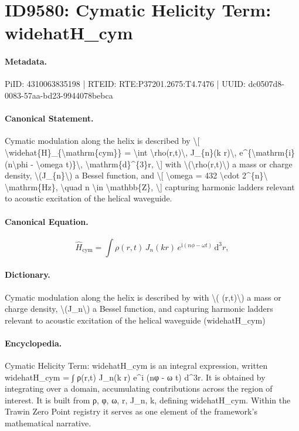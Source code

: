 \section*{ID9580: Cymatic Helicity Term: widehatH\_cym}
\paragraph{Metadata.}
PiID: 4310063835198 | RTEID: RTE:P37201.2675:T4.7476 | UUID: dc0507d8-0083-57aa-bd23-9944078bebca

\paragraph{Canonical Statement.}
Cymatic modulation along the helix is described by \textbackslash{}[ \textbackslash{}widehat\{H\}\_\{\textbackslash{}mathrm\{cym\}\} = \textbackslash{}int \textbackslash{}rho(r,t)\textbackslash{}, J\_\{n\}(k r)\textbackslash{}, e\textasciicircum{}\{\textbackslash{}mathrm\{i\} (n\textbackslash{}phi - \textbackslash{}omega t)\}\textbackslash{}, \textbackslash{}mathrm\{d\}\textasciicircum{}\{3\}r, \textbackslash{}] with \textbackslash{}(\textbackslash{}rho(r,t)\textbackslash{}) a mass or charge density, \textbackslash{}(J\_\{n\}\textbackslash{}) a Bessel function, and \textbackslash{}[ \textbackslash{}omega = 432 \textbackslash{}cdot 2\textasciicircum{}\{n\}\textbackslash{} \textbackslash{}mathrm\{Hz\}, \textbackslash{}quad n \textbackslash{}in \textbackslash{}mathbb\{Z\}, \textbackslash{}] capturing harmonic ladders relevant to acoustic excitation of the helical waveguide.

\paragraph{Canonical Equation.}
\[
\widehat{H}_{\mathrm{cym}} = \int \rho(r,t)\, J_{n}(k r)\, e^{\mathrm{i} (n\phi - \omega t)}\, \mathrm{d}^{3}r,
\]

\paragraph{Dictionary.}
Cymatic modulation along the helix is described by with \textbackslash{}( (r,t)\textbackslash{}) a mass or charge density, \textbackslash{}(J\_n\textbackslash{}) a Bessel function, and capturing harmonic ladders relevant to acoustic excitation of the helical waveguide (widehatH\_cym)

\paragraph{Encyclopedia.}
Cymatic Helicity Term: widehatH\_cym is an integral expression, written widehatH\_cym = ∫ ρ(r,t) J\_n(k r) e\textasciicircum{}i (nφ - ω t) d\textasciicircum{}3r. It is obtained by integrating over a domain, accumulating contributions across the region of interest. It is built from ρ, φ, ω, r, J\_n, k, defining widehatH\_cym. Within the Trawin Zero Point registry it serves as one element of the framework's mathematical narrative.

